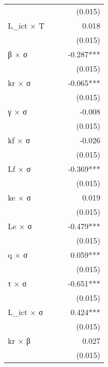 \begin{tabular}{lrrr}
                       &            &            &    (0.015) \\ 
L\_ict $\times$ T      &            &            &      0.018 \\ 
                       &            &            &    (0.015) \\ 
β $\times$ σ           &            &            &  -0.287*** \\ 
                       &            &            &    (0.015) \\ 
kr $\times$ σ          &            &            &  -0.065*** \\ 
                       &            &            &    (0.015) \\ 
γ $\times$ σ           &            &            &     -0.008 \\ 
                       &            &            &    (0.015) \\ 
kf $\times$ σ          &            &            &     -0.026 \\ 
                       &            &            &    (0.015) \\ 
Lf $\times$ σ          &            &            &  -0.369*** \\ 
                       &            &            &    (0.015) \\ 
ke $\times$ σ          &            &            &      0.019 \\ 
                       &            &            &    (0.015) \\ 
Le $\times$ σ          &            &            &  -0.479*** \\ 
                       &            &            &    (0.015) \\ 
q $\times$ σ           &            &            &   0.059*** \\ 
                       &            &            &    (0.015) \\ 
τ $\times$ σ           &            &            &  -0.651*** \\ 
                       &            &            &    (0.015) \\ 
L\_ict $\times$ σ      &            &            &   0.424*** \\ 
                       &            &            &    (0.015) \\ 
kr $\times$ β          &            &            &      0.027 \\ 
                       &            &            &    (0.015) \\ 

\end{tabular}
